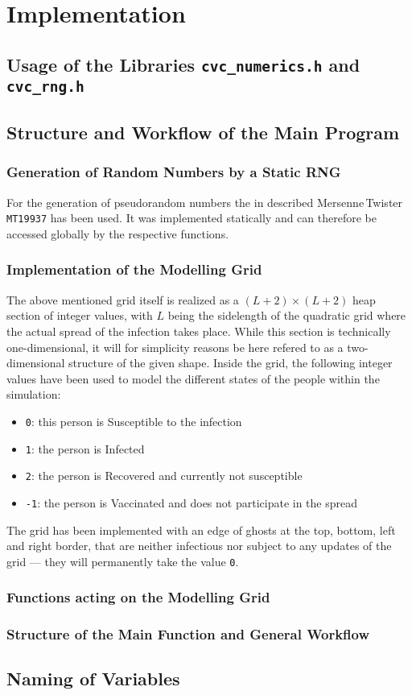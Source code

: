 \section{Implementation}

\subsection{Usage of the Libraries \texttt{cvc\_numerics.h} and \texttt{cvc\_rng.h}}

\subsection{Structure and Workflow of the Main Program}

\subsubsection*{Generation of Random Numbers by a Static RNG}

For the generation of pseudorandom numbers the in  described Mersenne\,Twister \texttt{MT19937} has been used. It was implemented statically and can therefore be accessed
globally by the respective functions.

\subsubsection*{Implementation of the Modelling Grid}

The above mentioned grid itself is realized as a $\left(L+2\right)\times \left(L+2\right)$ heap section of integer values, with $L$ being the sidelength of the quadratic grid where the actual spread of the infection takes place.
While this section is technically one-dimensional, it will for simplicity reasons be here refered to as a two-dimensional structure of the given shape. Inside the grid, the following integer values have been used 
to model the different states of the people within the simulation:
\begin{itemize}
    \item \texttt{0}: this person is Susceptible \susceptible{} to the infection
    \item \texttt{1}: the person is Infected \infected{}
    \item \texttt{2}: the person is Recovered \recovered{} and currently not susceptible
    \item \texttt{-1}: the person is Vaccinated \vaccinated{} and does not participate in the spread
\end{itemize}
The grid has been implemented with an edge of ghosts at the top, bottom, left and right border, that are neither infectious nor subject to any updates of the grid --- they will permanently take the value \texttt{0}.

\subsubsection*{Functions acting on the Modelling Grid}

\subsubsection*{Structure of the Main Function and General Workflow}

\subsection{Naming of Variables}